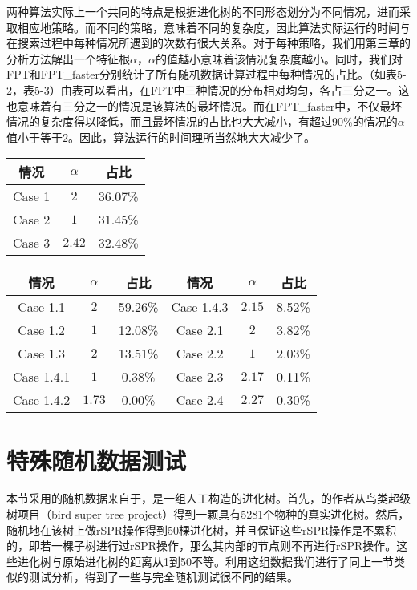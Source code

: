
两种算法实际上一个共同的特点是根据进化树的不同形态划分为不同情况，进而采取相应地策略。而不同的策略，意味着不同的复杂度，因此算法实际运行的时间与在搜索过程中每种情况所遇到的次数有很大关系。对于每种策略，我们用第三章的分析方法解出一个特征根$\alpha$，$\alpha$的值越小意味着该情况复杂度越小。同时，我们对FPT和FPT\_faster分别统计了所有随机数据计算过程中每种情况的占比。（如表5-2，表5-3）由表可以看出，在FPT中三种情况的分布相对均匀，各占三分之一。这也意味着有三分之一的情况是该算法的最坏情况。而在FPT\_faster中，不仅最坏情况的复杂度得以降低，而且最坏情况的占比也大大减小，有超过90\%的情况的$\alpha$值小于等于$2$。因此，算法运行的时间理所当然地大大减少了。

\begin{center}
\begin{table}[htpb]
\parbox{.34\linewidth}{
\centering
{}
\begin{tabular}{ c c c}
	\hline
  		情况 & $\alpha$ & 占比\\  \hline
  		Case 1 & $2$ & 36.07\% \\
  		Case 2 & $1$ & 31.45\%\\
  		Case 3 & $2.42$ & 32.48\% \\
	\hline
\end{tabular}
}
\hfill
\parbox{.6\linewidth}{
\centering
{}
\begin{tabular}{ c c c | c c c }
	\hline
  		情况 & $\alpha$ & 占比 & 情况 & $\alpha$ & 占比\\  \hline
  		Case 1.1 & $2$ & 59.26\% & Case 1.4.3 & $2.15$ &8.52\%  \\
  		Case 1.2 & $1$ & 12.08\% & Case 2.1 & $2$ & 3.82\% \\
  		Case 1.3 & $2$ & 13.51\% & Case 2.2 & $1$ & 2.03\% \\
  		Case 1.4.1 & $1$ & 0.38\%  & Case 2.3 & $2.17$ & 0.11\% \\
  		Case 1.4.2 & $1.73$ & 0.00\% & Case 2.4 & $2.27$ & 0.30\% \\
	\hline
\end{tabular}
}
\end{table}
\end{center}

\section{特殊随机数据测试}
本节采用的随机数据来自于\cite{hickey2008spr}，是一组人工构造的进化树。首先，\cite{hickey2008spr}的作者从鸟类超级树项目（bird super tree project）得到一颗具有5281个物种的真实进化树。然后，随机地在该树上做rSPR操作得到50棵进化树，并且保证这些rSPR操作是不累积的，即若一棵子树进行过rSPR操作，那么其内部的节点则不再进行rSPR操作。这些进化树与原始进化树的距离从1到50不等。利用这组数据我们进行了同上一节类似的测试分析，得到了一些与完全随机测试很不同的结果。

